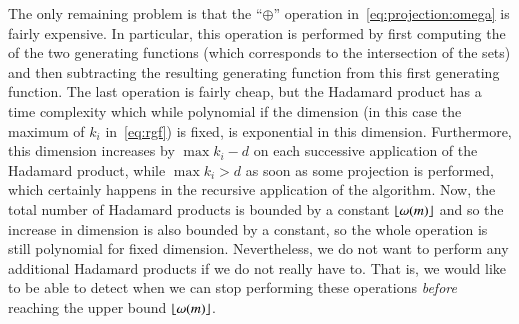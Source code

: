 The only remaining problem is that the ``$\oplus$'' operation
in~\eqref{eq:projection:omega} is fairly expensive.
In particular, this operation is performed by first
computing the  of the two generating functions
(which corresponds to the intersection of the sets) and
then subtracting the resulting generating function from this
first generating function.
The last operation is fairly cheap, but the Hadamard product
has a time complexity which while polynomial if the dimension (in
this case the maximum of $k_i$ in~\eqref{eq:rgf}) is fixed,
is exponential in this dimension.
Furthermore, this dimension increases by $\max k_i - d$ on each
successive application of the Hadamard product, while $\max k_i > d$
as soon as some projection is performed, which certainly happens in the
recursive application of the algorithm.
Now, the total number of Hadamard products is bounded by a constant
$\left\lfloor\omega(m)\right\rfloor$ and so the increase in dimension is also bounded
by a constant, so the whole operation is still polynomial for
fixed dimension.
Nevertheless, we do not want to perform any additional Hadamard
products if we do not really have to.
That is, we would like to be able to detect when we can stop
performing these operations {\em before} reaching the upper
bound $\left\lfloor\omega(m)\right\rfloor$.

